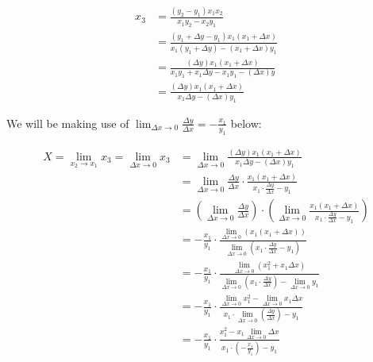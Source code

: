 \documentclass[9pt]{article}
\begin{document}
\begin{align*}
  x_3 &= \frac{(y_2 - y_1) x_1 x_2}{x_1 y_2 - x_2 y_1} \\
      &= \frac{(y_1 + \Delta y - y_1) x_1 (x_1 + \Delta x)}{x_1 (y_1 + \Delta y) - (x_1 + \Delta x) y_1} \\
      &= \frac{(\Delta y) x_1 (x_1 + \Delta x)}{x_1 y_1 + x_1 \Delta y - x_1 y_1 - (\Delta x) y} \\
      &= \frac{(\Delta y) x_1 (x_1 + \Delta x)}{x_1 \Delta y - (\Delta x) y_1}
\end{align*}

We will be making use of $\lim_{\Delta x \rightarrow 0} \frac{\Delta y}{\Delta x} = -\frac{x_1}{y_1}$ below:

\begin{align*}
X = \lim_{x_2 \rightarrow x_1} x_3 = \lim_{\Delta x \rightarrow 0} x_3 &= \lim_{\Delta x \rightarrow 0} \frac{(\Delta y) x_1 (x_1 + \Delta x)}{x_1 \Delta y - (\Delta x) y_1} \\
                                                                       &= \lim_{\Delta x \rightarrow 0} \frac{\Delta y}{\Delta x} \cdot \frac{x_1 (x_1 + \Delta x)}{x_1 \cdot \frac{\Delta y}{\Delta x} - y_1} \\
                                                                       &= (\lim_{\Delta x \rightarrow 0} \frac{\Delta y}{\Delta x}) \cdot (\lim_{\Delta x \rightarrow 0}\frac{x_1 (x_1 + \Delta x)}{x_1 \cdot \frac{\Delta y}{\Delta x} - y_1}) \\
                                                                       &= -\frac{x_1}{y_1} \cdot \frac{\lim_{\Delta x \rightarrow 0}(x_1 (x_1 + \Delta x))}{\lim_{\Delta x \rightarrow 0}(x_1 \cdot \frac{\Delta y}{\Delta x} - y_1)} \\
                                                                       &= -\frac{x_1}{y_1} \cdot \frac{\lim_{\Delta x \rightarrow 0} (x_1^2 + x_1 \Delta x)}{\lim_{\Delta x \rightarrow 0} (x_1 \cdot \frac{\Delta y}{\Delta x}) - \lim_{\Delta x \rightarrow 0} y_1} \\
                                                                       &= -\frac{x_1}{y_1} \cdot \frac{\lim_{\Delta x \rightarrow 0} x_1^2 - \lim_{\Delta x \rightarrow 0} x_1 \Delta x}{x_1 \cdot \lim_{\Delta x \rightarrow 0} (\frac{\Delta y}{\Delta x}) - y_1} \\
                                                                       &= -\frac{x_1}{y_1} \cdot \frac{x_1^2 - x_1 \lim_{\Delta x \rightarrow 0} \Delta x}{x_1 \cdot (-\frac{x_1}{y_1}) - y_1} \\

\end{align*}
\end{document}
